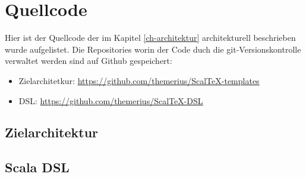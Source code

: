 \chapter{Quellcode}

Hier ist der Quellcode der im Kapitel \ref{ch-architektur} architekturell
beschrieben wurde aufgelistet.
Die Repositories worin der Code duch die git-Versionskontrolle
verwaltet werden sind auf Github gespeichert:

\begin{itemize}
  \item Zielarchitetkur: \url{https://github.com/themerius/ScalTeX-templates}
  \item DSL: \url{https://github.com/themerius/ScalTeX-DSL}
\end{itemize}

\section{Zielarchitektur}

\section{Scala DSL}

